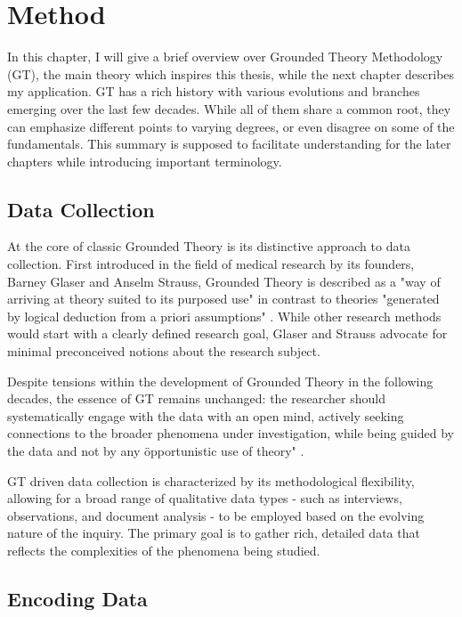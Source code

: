 \section{Method}

In this chapter, I will give a brief overview over Grounded Theory Methodology (GT), the main theory which inspires this
thesis, while the next chapter describes my application. GT has a rich history with various evolutions and branches
emerging over the last few decades. \cite{glaser_discovery_2017, corbin_basics_2015, charmaz_constructing_2014}
While all of them share a common root, they can emphasize different points to varying
degrees, or even disagree on some of the fundamentals. This summary is supposed to facilitate understanding for the later
chapters while introducing important terminology.

\subsection{Data Collection}

At the core of classic Grounded Theory is its distinctive approach to data collection. First introduced in the field of
medical research by its founders, Barney Glaser and Anselm Strauss, Grounded Theory is described as a "way of arriving
at theory suited to its purposed use" in contrast to theories "generated by logical deduction from a priori assumptions"
\cite[ p.3]{glaser_discovery_2017}. While other research methods would start with a clearly defined research goal, Glaser and
Strauss advocate for minimal preconceived notions about the research subject.

Despite tensions within the development of Grounded Theory in the following decades, the essence of GT
remains unchanged: the researcher should systematically engage with the data with an open mind, actively seeking
connections to the broader phenomena under investigation, while being guided by the data and not by any \"opportunistic
use of theory" \cite[ p.5]{glaser_discovery_2017}.\cite{niasse_limiting_2023}

GT driven data collection is characterized by its methodological flexibility, allowing for a broad range of qualitative
data types - such as interviews, observations, and document analysis - to be employed based on the evolving nature of
the inquiry. The primary goal is to gather rich, detailed data that reflects the complexities of the phenomena being studied.

\subsection{Encoding Data}

